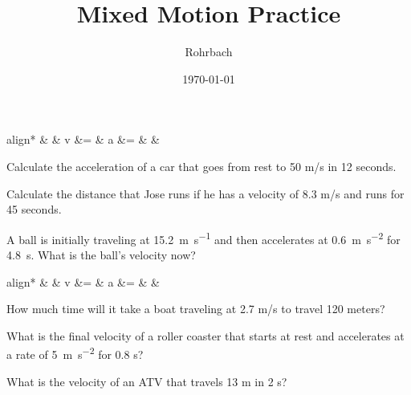 \documentclass[12pt]{exam}
\title{Mixed Motion Practice}
\author{Rohrbach}
\date{\today}
\begin{document}
\maketitle

\newcommand{\printeqs}{
  \begin{center}
    \vspace{-.5cm}
    \begin{empheq}[box=\fbox]{align*}
     &
     & 
      v &= \frac{d}{t}                        &    
      a &=  &
     &
    \end{empheq}
  \end{center}
}

\printeqs

\def\h{10em}

\begin{questions}
  \question 
    Calculate the acceleration of a car that goes from rest to 50 m/s in 12 seconds.
    \ku[\h]\vs
  
  \question
    Calculate the distance that Jose runs if he has a velocity of 8.3 m/s and runs for 45 seconds.
    \ku[\h]\vs
  
  \question
    A ball is initially traveling at \SI{15.2}{\meter\per\second} and then accelerates at \SI{0.6}{\meter\per\second^2} for \SI{4.8}{\second}.  What is the ball's velocity now?
    \ku[\h]\vs 


  \pagebreak
  \printeqs
  
  
  \question
    How much time will it take a boat traveling at 2.7 m/s to travel 120 meters?
    \ku[\h]\vs 

  \question
    What is the final velocity of a roller coaster that starts at rest and accelerates at a rate of \SI{5}{\meter\per\second^2} for 0.8 s?
    \ku[\h]\vs 

  \question
    What is the velocity of an ATV that travels 13 m in 2 s?
    \ku[\h]\vs 
  
\end{questions}
\end{document}
